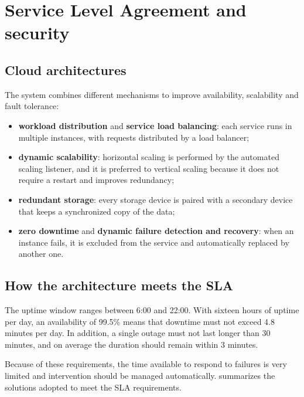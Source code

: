 \chapter{Service Level Agreement and security}
\label{ch:sla}

\section{Cloud architectures}

The system combines different mechanisms to improve availability, scalability and fault tolerance:


\begin{itemize}
    \item \textbf{workload distribution} and \textbf{service load balancing}:
      each service runs in multiple instances, with requests distributed
      by a load balancer;
    \item \textbf{dynamic scalability}: horizontal scaling is performed by the
      automated scaling listener, and it is preferred to vertical scaling because it
      does not require a restart and improves redundancy;
    \item \textbf{redundant storage}: every storage device is paired with a secondary device that keeps a synchronized copy of the data;
    \item \textbf{zero downtime} and \textbf{dynamic failure detection and
      recovery}: when an instance fails, it is excluded from the service and automatically replaced by another one.
\end{itemize}


\section{How the architecture meets the SLA}

The uptime window ranges between 6:00 and 22:00. With sixteen hours of uptime per day, an availability of 99.5\% means that downtime must not exceed 4.8 minutes per day. In addition, a single outage must not last longer than 30 minutes, and on average the duration should remain within 3 minutes.

Because of these requirements, the time available to respond to failures is very limited and intervention should be managed automatically.  summarizes the
solutions adopted to meet the SLA requirements.


